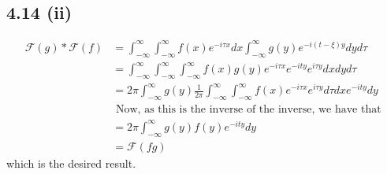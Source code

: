\documentclass[letterpaper,12pt]{article}
\theoremstyle{definition}
\begin{document}
\subsection*{4.14 (ii)}
        \begin{align*}
            \mathscr{F}(g)* \mathscr{F}(f) & = \int_{-\infty}^\infty \int_{-\infty}^\infty f(x)e^{-i\tau x} dx \int_{-\infty}^\infty g(y) e^{-i(t-\xi)y}dyd\tau \\
            & = \int_{-\infty}^\infty \int_{-\infty}^\infty \int_{-\infty}^\infty f(x)g(y)e^{-i \tau x}e^{-i t y}e^{i \tau y} dx dy d\tau \\
            & =2\pi  \int_{-\infty}^\infty g(y) \frac{1}{2\pi} \int_{-\infty}^\infty   \int_{-\infty}^\infty
            f(x)e^{-i \tau x} e^{i\tau y} d\tau dx e^{-i t y }dy \\
            & \text{ Now, as this is the inverse of the inverse, we have that  } \\
            & = 2 \pi \int_{-\infty}^\infty g(y)f(y)e^{-it y} dy \\
            & = \mathscr{F}(fg)
        \end{align*}
        which is the desired result.
\end{document}
